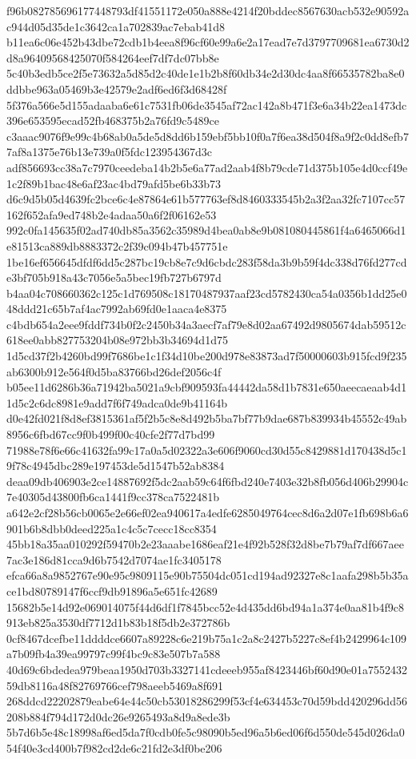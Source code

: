 \documentclass[11pt,a4paper]{article}
\begin{document}
{f96b082785696177448793df41551172e050a888e4214f20bddec8567630acb532e90592ac944d05d35de1c3642ca1a702839ac7ebab41d8
b11ea6c06e452b43dbe72cdb1b4eea8f96cf60e99a6e2a17ead7e7d3797709681ea6730d2d8a96409568425070f584264eef7df7dc07bb8e
5c40b3edb5ce2f5e73632a5d85d2c40de1e1b2b8f60db34e2d30dc4aa8f66535782ba8e0ddbbe963a05469b3e42579e2adf6ed6f3d68428f
5f376a566e5d155adaaba6e61c7531fb06de3545af72ac142a8b471f3e6a34b22ea1473dc396e653595ecad52fb468375b2a76fd9c5489ce
c3aaac9076f9e99c4b68ab0a5de5d8dd6b159ebf5bb10f0a7f6ea38d504f8a9f2c0dd8efb77af8a1375e76b13e739a0f5fdc123954367d3c
adf856693cc38a7c7970ceedeba14b2b5e6a77ad2aab4f8b79cde71d375b105e4d0ccf49e1c2f89b1bac48e6af23ac4bd79afd5be6b33b73
d6c9d5b05d4639fc2bce6c4e87864e61b577763ef8d8460333545b2a3f2aa32fc7107cc57162f652afa9ed748b2e4adaa50a6f2f06162e53
992c0fa145635f02ad740db85a3562c35989d4bea0ab8e9b081080445861f4a6465066d1e81513ca889db8883372c2f39c094b47b457751e
1be16ef656645dfdf6dd5c287bc19cb8e7c9d6cbdc283f58da3b9b59f4dc338d76fd277cde3bf705b918a43c7056e5a5bec19fb727b6797d
b4aa04c708660362c125c1d769508c18170487937aaf23cd5782430ca54a0356b1dd25e048ddd21c65b7af4ac7992ab69fd0e1aaca4e8375
c4bdb654a2eee9fddf734b0f2c2450b34a3aecf7af79e8d02aa67492d9805674dab59512c618ee0abb827753204b08e972bb3b34694d1d75
1d5cd37f2b4260bd99f7686be1c1f34d10be200d978e83873ad7f50000603b915fcd9f235ab6300b912e564f0d5ba83766bd26def2056c4f
b05ee11d6286b36a71942ba5021a9cbf909593fa44442da58d1b7831e650aeecaeaab4d11d5c2c6dc8981e9add7f6f749adca0de9b41164b
d0e42fd021f8d8ef3815361af5f2b5c8e8d492b5ba7bf77b9dae687b839934b45552c49ab8956c6fbd67cc9f0b499f00c40cfe2f77d7bd99
71988e78f6e66c41632fa99c17a0a5d02322a3e606f9060cd30d55c8429881d170438d5c19f78c4945dbc289e197453de5d1547b52ab8384
deaa09db406903e2ce14887692f5dc2aab59c64f6fbd240e7403e32b8fb056d406b29904c7e40305d43800fb6ca1441f9cc378ca7522481b
a642e2cf28b56cb0065e2e66ef02ea940617a4edfe6285049764cec8d6a2d07e1fb698b6a6901b6b8dbb0deed225a1c4c5c7cecc18cc8354
45bb18a35aa010292f59470b2e23aaabe1686eaf21e4f92b528f32d8be7b79af7df667aee7ac3e186d81cca9d6b7542d7074ae1fc3405178
efca66a8a9852767e90e95c9809115e90b75504dc051cd194ad92327e8c1aafa298b5b35ace1bd80789147f6ccf9db91896a5e651fc42689
15682b5e14d92e069014075f44d6df1f7845bcc52e4d435dd6bd94a1a374e0aa81b4f9c8913eb825a3530df7712d1b83b18f5db2e372786b
0cf8467dcefbe11ddddce6607a89228c6e219b75a1c2a8c2427b5227c8ef4b2429964c109a7b09fb4a39ea99797c99f4bc9c83e507b7a588
40d69c6bdedea979beaa1950d703b3327141cdeeeb955af8423446bf60d90e01a755243259db8116a48f82769766cef798aeeb5469a8f691
268ddcd22202879eabe64e44c50cb53018286299f53cf4e634453c70d59bdd420296dd56208b884f794d172d0dc26e9265493a8d9a8ede3b
5b7d6b5e48c18998af6ed5da7f0cdb0fe5c98090b5ed96a5b6ed06f6d550de545d026da054f40e3cd400b7f982cd2de6c21fd2e3df0be206
}
\end{document}
